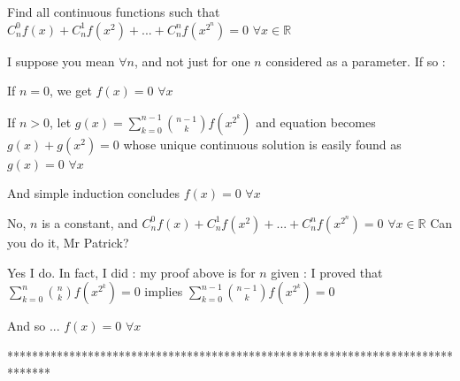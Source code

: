 \begin{solution}
	\begin{tcolorbox}Find all continuous functions such that
$C_{n}^{0}f(x)+C_{n}^{1}f(x^2)+...+C_{n}^{n}f(x^{2^n})=0$ $\forall x\in \mathbb{R}$\end{tcolorbox}
I suppose you mean  $\forall n$, and not just for one $n$ considered as a parameter. If so :

If $n=0$, we get $f(x)=0$ $\forall x$

If $n>0$, let $g(x)=\sum_{k=0}^{n-1}\binom {n-1}kf(x^{2^k})$ and equation becomes $g(x)+g(x^2)=0$ whose unique continuous solution is easily found as $g(x)=0$ $\forall x$

And simple induction concludes $\boxed{f(x)=0}$ $\forall x$
\end{solution}






\begin{solution}
	\begin{tcolorbox}No, $n$  is a constant, and $C_{n}^{0}f(x)+C_{n}^{1}f(x^2)+...+C_{n}^{n}f(x^{2^n})=0$ $\forall x\in \mathbb{R}$
Can you do it, Mr Patrick?\end{tcolorbox}
Yes I do.
In fact, I did : my proof above is for $n$ given : I proved that $\sum_{k=0}^{n}\binom nk f(x^{2^k})=0$ implies  $\sum_{k=0}^{n-1}\binom {n-1}k f(x^{2^k})=0$

And so ... $f(x)=0$ $\forall x$
\end{solution}
*******************************************************************************
